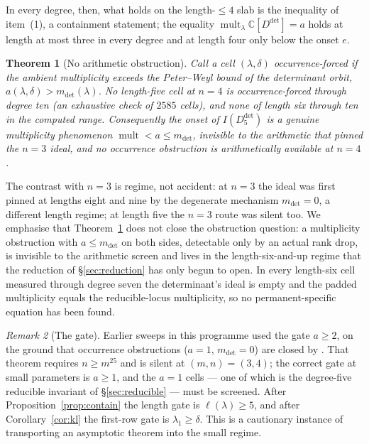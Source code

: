\documentclass[11pt]{amsart}
\theoremstyle{plain}
\newtheorem{theorem}{Theorem}[section]
\theoremstyle{definition}
\theoremstyle{remark}
\newtheorem{remark}[theorem]{Remark}
\DeclareMathOperator{\mult}{mult}
\newcommand{\bC}{\mathbb{C}}
\newcommand{\Ddet}{D^{\det}}
\begin{document}
In every degree, then, what holds on the length-$\le4$ slab is the inequality
of item~(1), a containment statement; the equality $\mult_\lambda\bC[\Ddet]=a$
holds at length at most three in every degree and at length four only below
the onset $e$.

\begin{theorem}[No arithmetic obstruction]\label{thm:arith}
Call a cell $(\lambda,\delta)$ \emph{occurrence-forced} if the ambient
multiplicity exceeds the Peter--Weyl bound of the determinant orbit,
$a(\lambda,\delta)>m_{\det}(\lambda)$.  No length-five cell at $n=4$ is
occurrence-forced through degree ten (an exhaustive check of $2585$ cells), and
none of length six through ten in the computed range.  Consequently the onset
of $I(\Ddet_5)$ is a genuine multiplicity phenomenon
$\mult<a\le m_{\det}$, invisible to the arithmetic that pinned the $n=3$ ideal,
and no occurrence obstruction is arithmetically available at $n=4$.
\end{theorem}

The contrast with $n=3$ is regime, not accident: at $n=3$ the ideal was first
pinned at lengths eight and nine by the degenerate mechanism $m_{\det}=0$, a
different length regime; at length five the $n=3$ route was silent too.  We
emphasise that Theorem~\ref{thm:arith} does not close the obstruction question:
a multiplicity obstruction with $a\le m_{\det}$ on both sides, detectable only
by an actual rank drop, is invisible to the arithmetic screen and lives in the
length-six-and-up regime that the reduction of \S\ref{sec:reduction} has only
begun to open.  In every length-six cell measured through degree seven the
determinant's ideal is empty and the padded multiplicity equals the
reducible-locus multiplicity, so no permanent-specific equation has been found.

\begin{remark}[The gate]\label{rem:gate}
Earlier sweeps in this programme used the gate $a\ge2$, on the ground that
occurrence obstructions ($a=1$, $m_{\det}=0$) are closed by \cite{BIP}.  That
theorem requires $n\ge m^{25}$ and is silent at $(m,n)=(3,4)$; the correct gate
at small parameters is $a\ge1$, and the $a=1$ cells --- one of which is the
degree-five reducible invariant of \S\ref{sec:reducible} --- must be screened.
After Proposition~\ref{prop:contain} the length gate is $\ell(\lambda)\ge5$,
and after Corollary~\ref{cor:kl} the first-row gate is $\lambda_1\ge\delta$.
This is a cautionary instance of transporting an asymptotic theorem into the
small regime.
\end{remark}
\end{document}
